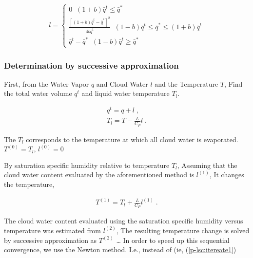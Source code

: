 \begin{eqnarray}
  l = \left\{ 
           \begin{array}{ll} \displaystyle
             0 \; \;  (1+b)\bar{q}^t \leq \bar{q}^* \\
            \displaystyle
             \frac{\left[(1+b)\bar{q}^t - \bar{q}^*\right]^2}
                  {4b\bar{q}^t}
               \; \;  (1-b)\bar{q}^t \leq \bar{q}^* \leq (1+b)\bar{q}^t  \\
            \displaystyle
             \bar{q}^t - \bar{q}^*
                \; \;  (1-b)\bar{q}^t \geq \bar{q}^*
           \end{array}
        \right. 
\end{eqnarray}

\begin{quote}
\protect\hypertarget{p-lsc:l}{}{\blazer[p-lsc:l]}
\end{quote}

\hypertarget{determination-by-successive-approximation}{%
\subsubsection{Determination by successive
approximation}\label{determination-by-successive-approximation}}

First, from the Water Vapor \(q\) and Cloud Water \(l\) and the
Temperature \(T\), Find the total water volume \(q^t\) and liquid water
temperature \(T_l\).

\begin{eqnarray}
  q^t   =  q + l \; , \\
  T_l   =  T - \frac{L}{C_P} l \; .
\end{eqnarray}

The \(T_l\) corresponds to the temperature at which all cloud water is
evaporated. \(T^{(0)} = T_l\), \(l^{(0)} = 0\)

By saturation specific humidity relative to temperature \(T_l\),
Assuming that the cloud water content evaluated by the aforementioned
method is \(l^{(1)}\), It changes the temperature,

\begin{eqnarray}
  T^{(1)} = T_l +  \frac{L}{C_P} l^{(1)} \; .
\end{eqnarray}

\begin{quote}
\protect\hypertarget{p-lsc:itereate1}{}{ }
\end{quote}

The cloud water content evaluated using the saturation specific humidity
versus temperature was estimated from \(l^{(2)}\), The resulting
temperature change is solved by successive approximation as \(T^{(2)}\)
\ldots{} In order to speed up this sequential convergence, we use the
Newton method. I.e., instead of (ie,
({[}\protect\hyperlink{p-lsc:itereate1}{p-lsc:itereate1{]}})

